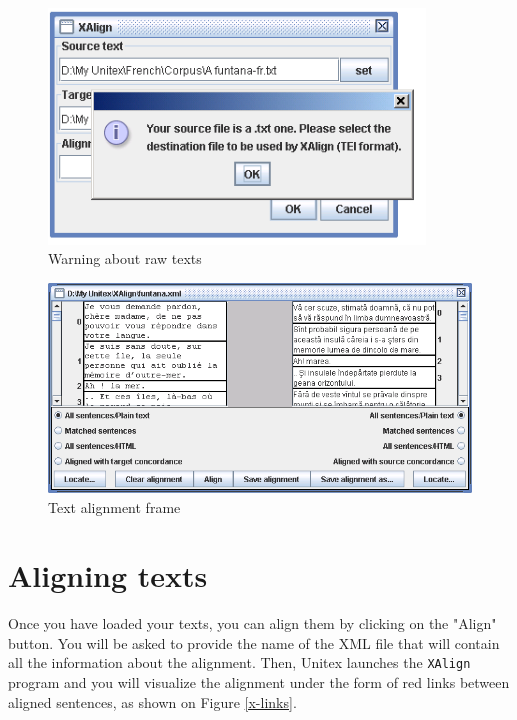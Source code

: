\begin{figure}[!ht]
\begin{center}
\includegraphics[width=10cm]{resources/img/figX-2.png}
\caption{Warning about raw texts\label{x-tei-name}}
\end{center}
\end{figure}
\clearpage


\begin{figure}[!ht]
\begin{center}
\includegraphics[width=15.5cm]{resources/img/figX-3.png}
\caption{Text alignment frame\label{x-frame}}
\end{center}
\end{figure}

\section{Aligning texts}
Once you have loaded your texts, you can align them by clicking on the "Align"
button. You will be asked to provide the name of the XML file that will
contain all the information about the alignment. Then, Unitex launches the
\verb+XAlign+ program and you will visualize the alignment under the form of
red links between aligned sentences, as shown on Figure \ref{x-links}.

